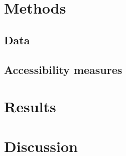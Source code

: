 \documentclass{article}
\begin{document}
\section{Methods}

\subsection{Data}



\subsection{Accessibility measures}






\section{Results}





\section{Discussion}





% 






\end{document}
